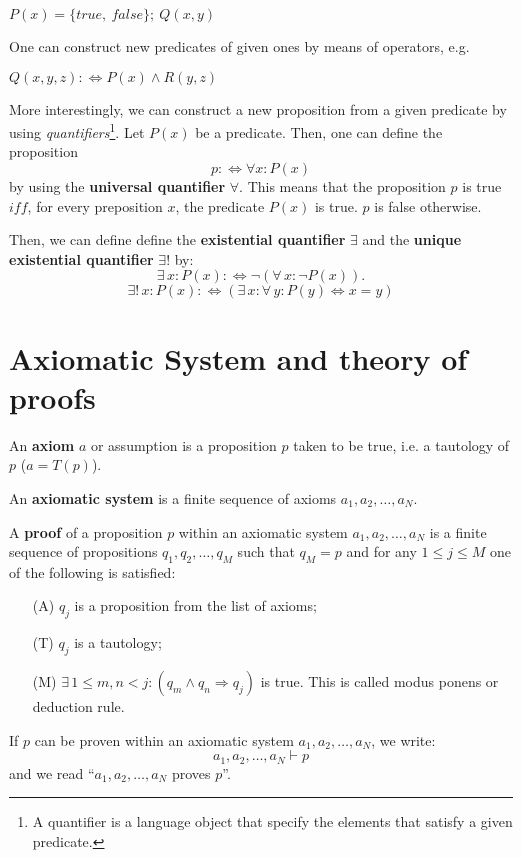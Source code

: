 \documentclass[root.tex]{subfiles}
\begin{document}
\begin{myex}
  $P(x) = \{true,\ false\};\ Q(x,y)$ 
\end{myex}

One can construct new predicates of given ones by means of operators, e.g.
\begin{myex}
  $Q(x,y,z):\Leftrightarrow P(x) \land R(y,z)$
\end{myex}

More interestingly, we can construct a new proposition from a given predicate by using \emph{quantifiers}\footnote{A quantifier is a language object that specify the elements that satisfy a given predicate.}.
Let $P(x)$ be a predicate. Then, one can define the proposition
$$p:\Leftrightarrow \forall x : P(x)$$
by using the \textbf{universal quantifier} $\forall$. This means that the proposition $p$ is true $iff$, for every preposition $x$, the predicate $P(x)$ is true. $p$ is false otherwise.

Then, we can define define the \textbf{existential quantifier} $\exists$  and the \textbf{unique existential quantifier} $\exists !$ by: 
$$
\exists \, x : P(x) : \Leftrightarrow \neg (\forall \, x : \neg P(x)).
$$
$$
\exists ! \, x : P(x) :\Leftrightarrow (\exists \, x : \forall \, y : P(y) \Leftrightarrow x=y)
$$

\section{Axiomatic System and theory of proofs}

\begin{mydef}
  An \textbf{axiom} $a$ or assumption is a proposition $p$ taken to be true, i.e. a tautology of $p$ ($a=T(p)$).
\end{mydef}

\begin{mydef}
  An \textbf{axiomatic system} is a finite sequence of axioms $a_1,a_2,\ldots,a_N$.
\end{mydef}

\begin{mydef}
  A \textbf{proof} of a proposition $p$ within an axiomatic system $a_1,a_2,\ldots,a_N$ is a finite sequence of propositions $q_1,q_2,\ldots,q_M$ such that $q_M=p$ and for any $1\leq j \leq M$ one of the following is satisfied:
\begin{enumerate}
\item[(A)] $q_j$ is a proposition from the list of axioms;
\item[(T)] $q_j$ is a tautology;
\item[(M)] $\exists \, 1\leq m,n <j : (q_m\land q_n \Rightarrow q_j)$ is true. This is called modus ponens or deduction rule.
\end{enumerate}
\end{mydef}
\begin{remark}

If $p$ can be proven within an axiomatic system $a_1,a_2,\ldots,a_N$, we write:
$$
a_1,a_2,\ldots,a_N \vdash p
$$
and we read ``$a_1,a_2,\ldots,a_N$ proves $p$''.
\end{remark}
\end{document}
